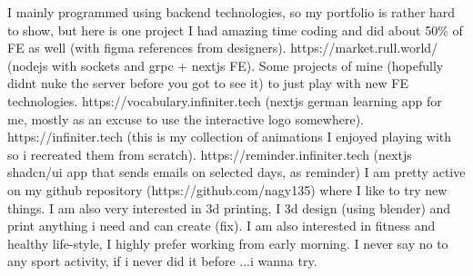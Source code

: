 \documentclass{my_cv}
\begin{document}
		\begin{adjustwidth}{2em}{0em}
			I mainly programmed using backend technologies, so my portfolio is rather hard to show, but here is one project 
			I had amazing time coding and did about 50\% of FE as well (with figma references from designers). 
			https://market.rull.world/ (nodejs with sockets and grpc + nextjs FE).
			Some projects of mine (hopefully didnt nuke the server before you got to see it) to just play with new FE technologies.
			https://vocabulary.infiniter.tech (nextjs german learning app for me, mostly as an excuse to use the interactive logo somewhere).
			https://infiniter.tech (this is my collection of animations I enjoyed playing with so i recreated them from scratch).
			https://reminder.infiniter.tech (nextjs shadcn/ui app that sends emails on selected days, as reminder) I am pretty active on my github repository (https://github.com/nagy135) where I like to try new things. 
			I am also very interested in 3d printing, I 3d design (using blender) and print anything i need and can create (fix).
			I am also interested in fitness and healthy life-style, I highly prefer working from early morning. I never say no to any sport activity, if i never did it before ...i wanna try.
		\end{adjustwidth}


	
\end{document}
